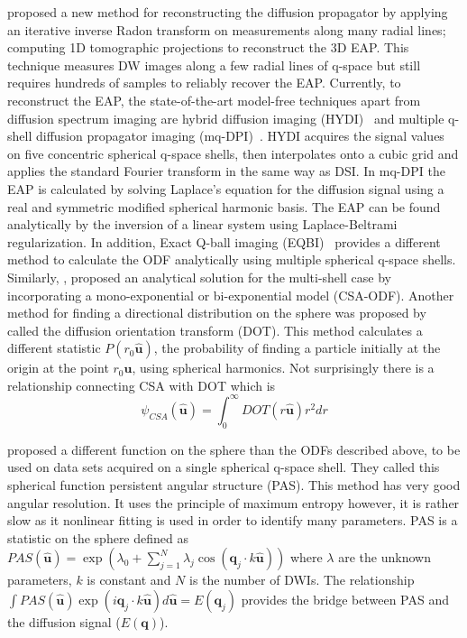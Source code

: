 \documentclass{bioinfo}
\begin{document}
\begin{methods}
\citet{pickalov2006tra} proposed a new method for
reconstructing the diffusion propagator by applying an iterative inverse
Radon transform on measurements along many radial lines; computing
1D tomographic projections to reconstruct the 3D EAP. This technique
measures DW images along a few radial lines of q-space but still requires
hundreds of samples to reliably recover the EAP. Currently, to reconstruct
the EAP, the state-of-the-art model-free techniques apart from diffusion
spectrum imaging are hybrid diffusion imaging (HYDI)~\citep{wu2007hybrid}
and multiple q-shell diffusion propagator imaging (mq-DPI)~\citep{descoteaux2010multiple}.
HYDI acquires the signal values on five concentric spherical q-space
shells, then interpolates onto a cubic grid and applies the standard
Fourier transform in the same way as DSI. In mq-DPI the EAP is calculated
by solving Laplace's equation for the diffusion signal using a real
and symmetric modifi{}ed spherical harmonic basis. The EAP can be
found analytically by the inversion of a linear system using Laplace-Beltrami
regularization. In addition, Exact Q-ball imaging (EQBI)~\citep{canalesrodriguez2009}
provides a different method to calculate the ODF analytically using
multiple spherical q-space shells. Similarly, \citet{Aganj2010},
proposed an analytical solution for the multi-shell case by incorporating
a mono-exponential or bi-exponential model (CSA-ODF). Another method
for finding a directional distribution on the sphere was proposed
by \citet{ozarslan2006resolution} called the diffusion
orientation transform (DOT). This method calculates a different statistic
$P(r_{0}\mathbf{\hat{u}})$, the probability of finding a particle
initially at the origin at the point $r_{0}\mathbf{\hat{u}}$, using
spherical harmonics. Not surprisingly there is a relationship connecting
CSA with DOT which is \foreignlanguage{british}{\begin{equation}
\psi_{CSA}(\hat{\mathbf{u}})=\int_{0}^{\infty}DOT(r\hat{\mathbf{u}})r^{2}dr\label{eq:CSAandDOT}\end{equation}
}

\citet{JansonsPAS2003} proposed
a different function on the sphere than the ODFs described above,
to be used on data sets acquired on a single spherical q-space shell.
They called this spherical function persistent angular structure (PAS).
This method has very good angular resolution. It uses the principle
of maximum entropy however, it is rather slow as it nonlinear fitting
is used in order to identify many parameters. PAS is a statistic on
the sphere defined as $PAS(\hat{\mathbf{u}})=\exp(\lambda_{0}+\sum_{j=1}^{N}\lambda_{j}\cos(\mathbf{q}_{j}\cdot k\hat{\mathbf{u}}))$
where $\lambda$ are the unknown parameters, $k$ is constant and
$N$ is the number of DWIs. The relationship $\int PAS(\hat{\mathbf{u}})\exp(i\mathbf{q}_{j}\cdot k\hat{\mathbf{u}})d\hat{\mathbf{u}}=E(\mathbf{q}_{j})$
provides the bridge between PAS and the diffusion signal ($E(\mathbf{q})$).


\end{methods}
\end{document}
